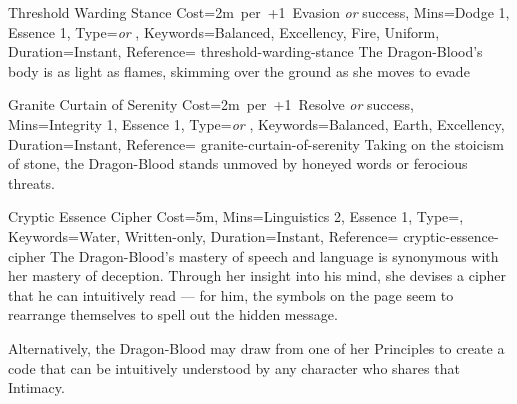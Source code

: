 

\begin{Charm}{Threshold Warding Stance}{%
    Cost=2m~per~+1~Evasion \emph{or} success,
    Mins={Dodge 1, Essence 1},
    Type=\SupplementalType \emph{or} \ReflexiveType,
    Keywords={Balanced, Excellency, Fire, Uniform},
    Duration=Instant,
    Reference=\cite*[p.~190]{db}
}{threshold-warding-stance}
    The Dragon-Blood's body is as light as flames, skimming over the ground as
    she moves to evade 
\end{Charm}




\begin{Charm}{Granite Curtain of Serenity}{%
    Cost=2m~per~+1~Resolve \emph{or} success,
    Mins={Integrity 1, Essence 1},
    Type=\SupplementalType \emph{or} \ReflexiveType,
    Keywords={Balanced, Earth, Excellency},
    Duration=Instant,
    Reference=\cite*[p.~194]{db}
}{granite-curtain-of-serenity}
    Taking on the stoicism of stone, the Dragon-Blood stands unmoved by honeyed
    words or ferocious threats. 
\end{Charm}




\begin{Charm}{Cryptic Essence Cipher}{%
    Cost=5m,
    Mins={Linguistics 2, Essence 1},
    Type=\SimpleType,
    Keywords={Water, Written-only},
    Duration=Instant,
    Reference=\cite*[p.~209]{db}
}{cryptic-essence-cipher}
    The Dragon-Blood's mastery of speech and language is synonymous with her
    mastery of deception.  Through her insight
    into his mind, she devises a cipher that he can intuitively read --- for
    him, the symbols on the page seem to rearrange themselves to spell out the
    hidden message. 

    Alternatively, the Dragon-Blood may draw from one of her Principles to
    create a code that can be intuitively understood by any character who
    shares that Intimacy.
\end{Charm}



